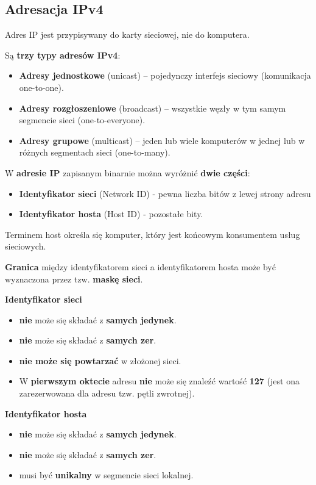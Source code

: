 \documentclass[a4paper]{article}
\begin{document}
\subsection{Adresacja IPv4}

Adres IP jest przypisywany do karty sieciowej, nie do komputera.

Są \textbf{trzy typy adresów IPv4}:
\begin{itemize}
    \item \textbf{Adresy jednostkowe} (unicast) – pojedynczy interfejs sieciowy (komunikacja one-to-one).
    \item \textbf{Adresy rozgłoszeniowe} (broadcast) – wszystkie węzły w tym samym segmencie sieci (one-to-everyone).
    \item \textbf{Adresy grupowe} (multicast) – jeden lub wiele komputerów w jednej lub w różnych segmentach sieci (one-to-many).
\end{itemize}

W \textbf{adresie IP} zapisanym binarnie można wyróżnić \textbf{dwie części}:
\begin{itemize}
    \item \textbf{Identyfikator sieci} (Network ID) - pewna liczba bitów z lewej strony adresu
    \item \textbf{Identyfikator hosta} (Host ID) - pozostałe bity.
\end{itemize}
Terminem host określa się komputer, który jest końcowym konsumentem usług sieciowych.

\textbf{Granica} między identyfikatorem sieci a identyfikatorem hosta może być wyznaczona przez
tzw. \textbf{maskę sieci}.

\textbf{Identyfikator sieci}
\begin{itemize}
    \item \textbf{nie} może się składać z \textbf{samych jedynek}.
    \item \textbf{nie} może się składać z \textbf{samych zer}.
    \item \textbf{nie może się powtarzać} w złożonej sieci.
    \item W \textbf{pierwszym oktecie} adresu \textbf{nie} może się znaleźć wartość \textbf{127} (jest ona zarezerwowana dla adresu tzw. pętli zwrotnej).
\end{itemize}

\textbf{Identyfikator hosta}
\begin{itemize}
    \item \textbf{nie} może się składać z \textbf{samych jedynek}.
    \item \textbf{nie} może się składać z \textbf{samych zer}.
    \item musi być \textbf{unikalny} w segmencie sieci lokalnej.
\end{itemize}
\end{document}
